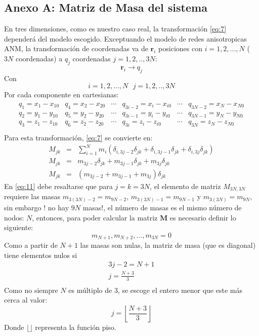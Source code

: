 \begin{appendix}
\chapter{Anexo A: Matriz de Masa del sistema }\label{AnexoA}
En tres dimensiones, como es nuestro caso real, la transformaci\'{o}n \eqref{eq:7} depender\'{a} del modelo escogido. Exceptuando el modelo de redes anisotropicas ANM, la transformaci\'{o}n de coordenadas va de $\mathbf{r}_{i}$ posiciones con $i=1,2,...,N$ ($3N$ coordenadas) a $q_j$ coordenadas $j=1,2,..,3N$:
\begin{equation*}
\mathbf{r}_{i}\longrightarrow q_{j}
\end{equation*}
Con
\begin{equation*}
i=1,2,...,N\mbox{  }j=1,2,..,3N
\end{equation*}
Por cada componente en cartesianas:
\begin{eqnarray}\label{eq:10}
\begin{array}{cccccc}
q_1=x_1-x_{10}&q_4=x_2-x_{20}&\cdots &q_{3i-2}=x_i-x_{i0}&\cdots &q_{3N-2}=x_N-x_{N0} \\
q_2=y_1-y_{10}&q_5=y_2-y_{20}&\cdots &q_{3i-1}=y_i-y_{i0}&\cdots &q_{3N-1}=y_N-y_{N0}\\
q_3=z_1-z_{10}&q_6=z_2-z_{20}&\cdots &q_{3i}=z_i-z_{i0}&\cdots &q_{3N}=z_N-z_{N0}\\
\end{array}
\end{eqnarray}
Para esta transformaci\'{o}n, \eqref{eq:7} se convierte en:
\begin{eqnarray}\label{eq:11}
M_{jk}&=&\sum_{i=1}^{N} m_{i}\left( \delta_{i,3j-2}\delta_{jk}+\delta_{i,3j-1}\delta_{jk}+  \delta_{i,3j}\delta_{jk}\right)\nonumber \\
M_{jk}&=&m_{3j-2}\delta_{jk}+m_{3j-1}\delta_{jk}+m_{3j}\delta_{jk} \nonumber \\
M_{jk}&=&\left( m_{3j-2}+m_{3j-1}+m_{3j} \right) \delta_{jk}
\end{eqnarray}
En \eqref{eq:11} debe resaltarse que para $j=k=3N$, el elemento de matriz $M_{3N,3N}$ requiere las masas $m_{3(3N)-2}=m_{9N-2}$, $m_{3(3N)-1}=m_{9N-1}$ y $m_{3(3N)}=m_{9N}$, sin embargo ! no hay $9N$ masas!, el n\'{u}mero de masas es el mismo n\'{u}mero de nodos: $N$, entonces, para poder calcular la matriz $\mathbf{M}$ es necesario definir lo siguiente:
\begin{equation}\label{eq:12}
m_{N+1},m_{N+2},...,m_{3N}=0
\end{equation}
Como a partir de $N+1$ las masas son nulas, la matriz de masa (que es diagonal) tiene elementos nulos si  
\begin{eqnarray*}
3j-2=N+1\\
j=\frac{N+3}{3} \\
\end{eqnarray*}
Como no siempre $N$ es m\'{u}ltiplo de 3, se escoge el entero menor que este m\'{a}s cerca al valor:
\begin{equation}\label{eq:13}
j=\left \lfloor\frac{N+3}{3}\right \rfloor
\end{equation}
Donde $\lfloor \rfloor$ representa la funci\'{o}n piso.


\end{appendix}
